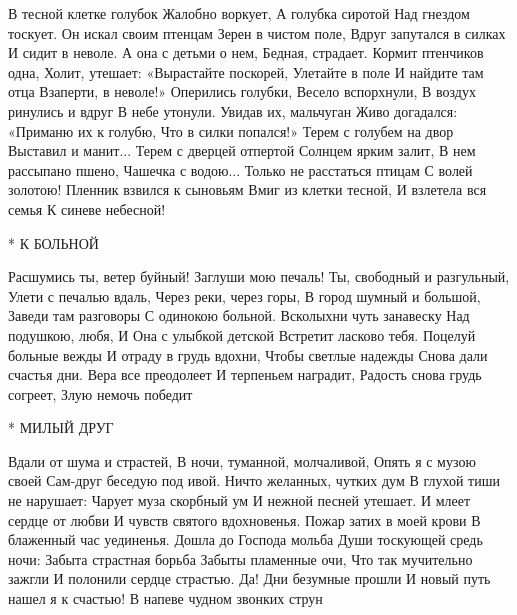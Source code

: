 В тесной клетке голубок
                 Жалобно воркует,
А голубка сиротой
                  Над гнездом  тоскует.
Он искал своим птенцам
                  Зерен в чистом поле,
Вдруг запутался в силках
                  И сидит в неволе.
А она с детьми о нем,
                  Бедная, страдает.
Кормит птенчиков одна,
                  Холит, утешает:
«Вырастайте поскорей,
                  Улетайте в поле
И найдите там отца
                   Взаперти, в неволе!»
Оперились голубки,
                   Весело вспорхнули,
В воздух ринулись и вдруг
                   В небе утонули.
Увидав их, мальчуган
                   Живо догадался:
«Приманю их к голубю,
                   Что в силки попался!»
Терем с голубем на двор
                    Выставил и манит...
Терем с дверцей отпертой
                    Солнцем ярким залит,
В нем рассыпано пшено,
                    Чашечка с водою...
Только не расстаться птицам
                     С волей золотою!
Пленник взвился к сыновьям
                     Вмиг из клетки тесной,
И взлетела вся семья
                     К синеве небесной!


* К БОЛЬНОЙ

Расшумись ты, ветер буйный!
        Заглуши мою печаль!
Ты, свободный и разгульный,
        Улети с печалью вдаль,
Через реки, через горы,
        В город шумный и большой,
Заведи там разговоры
        С одинокою больной.
Всколыхни чуть занавеску
        Над подушкою, любя,
И Она с улыбкой детской
        Встретит ласково тебя.
Поцелуй больные вежды
        И отраду в грудь вдохни,
Чтобы светлые надежды
        Снова дали счастья дни.
Вера все преодолеет
         И терпеньем наградит,
Радость снова грудь согреет,
         Злую немочь победит


* МИЛЫЙ ДРУГ

                         Вдали от шума и страстей,
       В ночи, туманной, молчаливой,
                          Опять я с музою своей
       Сам-друг беседую под ивой.
                          Ничто желанных, чутких дум
        В глухой тиши не нарушает:
                          Чарует муза скорбный ум
        И нежной песней утешает.
                           И млеет сердце от любви
        И чувств святого вдохновенья.
                           Пожар затих в моей крови
        В блаженный час уединенья.
                           Дошла до Господа мольба
         Души тоскующей средь ночи:
                           Забыта страстная борьба
         Забыты пламенные очи,
                           Что так мучительно зажгли
          И полонили сердце страстью.
                           Да! Дни безумные прошли
        И новый путь нашел я к счастью!
                           В напеве чудном звонких струн


